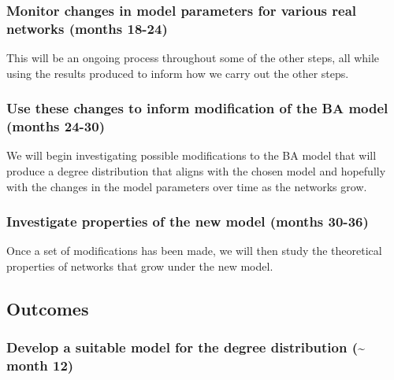 \documentclass[
]{article}
\begin{document}
\subsubsection*{Monitor changes in model parameters for various real
networks (months
18-24)}\label{monitor-changes-in-model-parameters-for-various-real-networks-months-18-24}

This will be an ongoing process throughout some of the other steps, all
while using the results produced to inform how we carry out the other
steps.

\subsubsection*{Use these changes to inform modification of the BA model
(months
24-30)}\label{use-these-changes-to-inform-modification-of-the-ba-model-months-24-30}

We will begin investigating possible modifications to the BA model that
will produce a degree distribution that aligns with the chosen model and
hopefully with the changes in the model parameters over time as the
networks grow.

\subsubsection*{Investigate properties of the new model (months
30-36)}\label{investigate-properties-of-the-new-model-months-30-36}

Once a set of modifications has been made, we will then study the
theoretical properties of networks that grow under the new model.

\subsection{Outcomes}\label{outcomes}

\subsubsection*{Develop a suitable model for the degree distribution
(\textasciitilde{} month
12)}\label{develop-a-suitable-model-for-the-degree-distribution-month-12}
\end{document}
